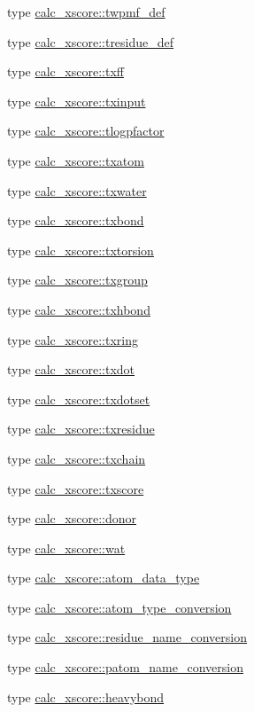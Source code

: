 \begin{DoxyCompactItemize}
\item 
type \hyperlink{structcalc__xscore_1_1twpmf__def}{calc\-\_\-xscore\-::twpmf\-\_\-def}
\item 
type \hyperlink{structcalc__xscore_1_1tresidue__def}{calc\-\_\-xscore\-::tresidue\-\_\-def}
\item 
type \hyperlink{structcalc__xscore_1_1txff}{calc\-\_\-xscore\-::txff}
\item 
type \hyperlink{structcalc__xscore_1_1txinput}{calc\-\_\-xscore\-::txinput}
\item 
type \hyperlink{structcalc__xscore_1_1tlogpfactor}{calc\-\_\-xscore\-::tlogpfactor}
\item 
type \hyperlink{structcalc__xscore_1_1txatom}{calc\-\_\-xscore\-::txatom}
\item 
type \hyperlink{structcalc__xscore_1_1txwater}{calc\-\_\-xscore\-::txwater}
\item 
type \hyperlink{structcalc__xscore_1_1txbond}{calc\-\_\-xscore\-::txbond}
\item 
type \hyperlink{structcalc__xscore_1_1txtorsion}{calc\-\_\-xscore\-::txtorsion}
\item 
type \hyperlink{structcalc__xscore_1_1txgroup}{calc\-\_\-xscore\-::txgroup}
\item 
type \hyperlink{structcalc__xscore_1_1txhbond}{calc\-\_\-xscore\-::txhbond}
\item 
type \hyperlink{structcalc__xscore_1_1txring}{calc\-\_\-xscore\-::txring}
\item 
type \hyperlink{structcalc__xscore_1_1txdot}{calc\-\_\-xscore\-::txdot}
\item 
type \hyperlink{structcalc__xscore_1_1txdotset}{calc\-\_\-xscore\-::txdotset}
\item 
type \hyperlink{structcalc__xscore_1_1txresidue}{calc\-\_\-xscore\-::txresidue}
\item 
type \hyperlink{structcalc__xscore_1_1txchain}{calc\-\_\-xscore\-::txchain}
\item 
type \hyperlink{structcalc__xscore_1_1txscore}{calc\-\_\-xscore\-::txscore}
\item 
type \hyperlink{structcalc__xscore_1_1donor}{calc\-\_\-xscore\-::donor}
\item 
type \hyperlink{structcalc__xscore_1_1wat}{calc\-\_\-xscore\-::wat}
\item 
type \hyperlink{structcalc__xscore_1_1atom__data__type}{calc\-\_\-xscore\-::atom\-\_\-data\-\_\-type}
\item 
type \hyperlink{structcalc__xscore_1_1atom__type__conversion}{calc\-\_\-xscore\-::atom\-\_\-type\-\_\-conversion}
\item 
type \hyperlink{structcalc__xscore_1_1residue__name__conversion}{calc\-\_\-xscore\-::residue\-\_\-name\-\_\-conversion}
\item 
type \hyperlink{structcalc__xscore_1_1patom__name__conversion}{calc\-\_\-xscore\-::patom\-\_\-name\-\_\-conversion}
\item 
type \hyperlink{structcalc__xscore_1_1heavybond}{calc\-\_\-xscore\-::heavybond}
\end{DoxyCompactItemize}
